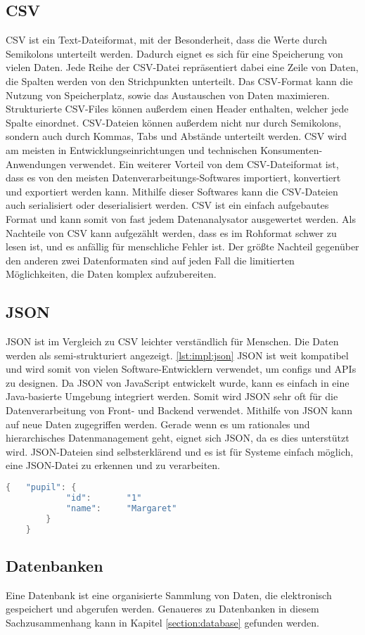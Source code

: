     

\subsection{CSV}
CSV ist ein Text-Dateiformat, mit der Besonderheit, dass die Werte durch Semikolons unterteilt werden. Dadurch eignet es sich für eine Speicherung von vielen Daten. Jede Reihe der CSV-Datei repräsentiert dabei eine Zeile von Daten, die Spalten werden von den Strichpunkten unterteilt. Das CSV-Format kann die Nutzung von Speicherplatz, sowie das Austauschen von Daten maximieren. Strukturierte CSV-Files können außerdem einen Header enthalten, welcher jede Spalte einordnet. CSV-Dateien können außerdem nicht nur durch Semikolons, sondern auch durch Kommas, Tabs und Abstände unterteilt werden. CSV wird am meisten in Entwicklungseinrichtungen und technischen Konsumenten-Anwendungen verwendet. Ein weiterer Vorteil von dem CSV-Dateiformat ist, dass es von den meisten Datenverarbeitungs-Softwares importiert, konvertiert und exportiert werden kann. Mithilfe dieser Softwares kann die CSV-Dateien auch serialisiert oder deserialisiert werden. CSV ist ein einfach aufgebautes Format und kann somit von fast jedem Datenanalysator ausgewertet werden. Als Nachteile von CSV kann aufgezählt werden, dass es im Rohformat schwer zu lesen ist, und es anfällig für menschliche Fehler ist. Der größte Nachteil gegenüber den anderen zwei Datenformaten sind auf jeden Fall die limitierten Möglichkeiten, die Daten komplex aufzubereiten. \cite{csvOrJson} 


\subsection{JSON}
JSON ist im Vergleich zu CSV leichter verständlich für Menschen. Die Daten werden als semi-strukturiert angezeigt. \ref{lst:impl:json} JSON ist weit kompatibel und wird somit von vielen Software-Entwicklern verwendet, um configs und APIs zu designen. Da JSON von JavaScript entwickelt wurde, kann es einfach in eine Java-basierte Umgebung integriert werden. Somit wird JSON sehr oft für die Datenverarbeitung von Front- und Backend verwendet. Mithilfe von JSON kann auf neue Daten zugegriffen werden. Gerade wenn es um rationales und hierarchisches Datenmanagement geht, eignet sich JSON, da es dies unterstützt wird. JSON-Dateien sind selbsterklärend und es ist für Systeme einfach möglich, eine JSON-Datei zu erkennen und zu verarbeiten. \cite{csvOrJson}


\begin{lstlisting}[language=java,caption=JSON Beispiel,label=lst:impl:json]
    {   "pupil": {
            "id":       "1"
            "name":     "Margaret"
        }
    }
\end{lstlisting}

\subsection{Datenbanken}

Eine Datenbank ist eine organisierte Sammlung von Daten, die elektronisch gespeichert und abgerufen werden.
Genaueres zu Datenbanken in diesem Sachzusammenhang kann in Kapitel \ref{section:database} gefunden werden.
